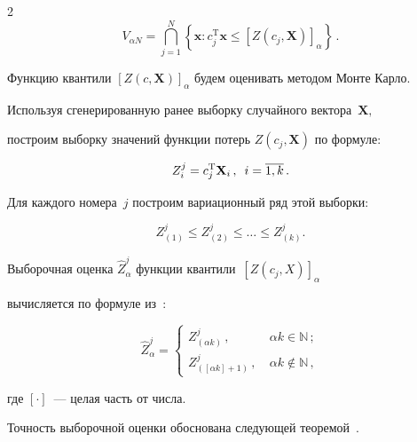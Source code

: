 \begin{multicols}{2}
\begin{equation*}
V_{\alpha N}=\bigcap\limits_{j=1}^{N} \left\{ \mathbf {x}: c_j^{\mathrm{T}} 

\mathbf{x} \leqslant  \left [ Z\left(c_j, \mathbf {X} \right) \right]_\alpha\right \}\,.


\end{equation*}

Функцию квантили $[Z(c,\mathbf {X})]_\alpha$ будем оценивать методом Мон\-те Карло.



Используя сгенерированную ранее выборку случайного вектора~$\mathbf {X},$ 

по\-стро\-им выборку значений функ\-ции потерь $Z(c_j,\mathbf{X})$ по формуле:

$$

Z_i^j=c_j^{\mathrm{T}} \mathbf {X}_i\,,\enskip i=\overline{1,k}\,.

$$

Для каждого номера~$j$ построим вариационный ряд этой выборки:

$$

Z_{(1)}^j \leq Z_{(2)}^j\leq \dots \leq Z_{(k)}^j.

$$

Выборочная оценка $\widehat Z^j_\alpha$ функции квантили~$\left[Z(c_j,X)\right]_\alpha$  

вы\-чис\-ля\-ет\-ся по формуле  из~\cite{kankibzun}:

\begin{equation*}

\widehat Z^j_\alpha=

\begin{cases}

Z ^j_{(\alpha k)}\,, &\ \alpha k\in \mathbb{ N}\,;\\

Z ^j_{([\alpha k]+1)}\,, &\ \alpha k\notin \mathbb{ N}\,,

\end{cases}

\end{equation*}

где $[\cdot]$~--- целая часть от числа.



Точность выборочной оценки обоснована сле\-ду\-ющей тео\-ре\-мой~\cite{bakh}.



\smallskip



\noindent


\end{multicols}
